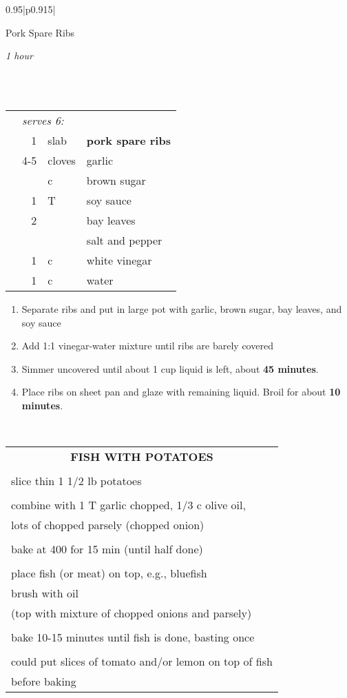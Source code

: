 \documentclass[8pt]{report}
\newcommand{\ingredmargin}{0.25cm}
\newcommand{\fr}[2]{\nicefrac{#1}{#2}}
\newenvironment{recipe}[3]
  {\bigskip \bigskip 
\begin{tabular*}{0.95\textwidth}{|p{0.915\textwidth}|} \hline \vspace{0.25mm}
\begin{minipage}{0.7\textwidth}	\begin{flushleft} {\Large \textsf{#1}} \end{flushleft} \end{minipage}
\begin{minipage}{0.2\textwidth} \begin{flushright} \emph{#2} \end{flushright} \end{minipage} \\ \\ \hline
\begin{ingreds}{#3} \addcontentsline{toc}{section}{#1} \phantomsection \label{rec:#1}} 
  {\\ \hline \end{tabular*} \noindent}
\newenvironment{ingreds}[1]
  {\begin{tabular}{lrlp{0.6\textwidth}} \hspace{\ingredmargin} & \multicolumn{3}{l}{\it #1:} \\}
  {\end{tabular} \medskip}
\newcommand{\ingredsdone}{\end{ingreds}\begin{enumerate}}
\newcommand{\stepsdone}{\end{enumerate} \medskip}
\newcommand{\ingredient}[3]{\hspace{\ingredmargin} & #1 & #2 & #3 \\}
\begin{document}
\begin{recipe}{Pork Spare Ribs}{1 hour}{serves 6}
\index{chinese!pork spare ribs} \index{pork!spare ribs}
\ingredient{1}{slab}{\bf pork spare ribs}
\ingredient{4-5}{cloves}{garlic}
\ingredient{\fr14}{c}{brown sugar}
\ingredient{1}{T}{soy sauce}
\ingredient{2}{}{bay leaves}
\ingredient{}{}{salt and pepper}
\ingredient{1 \fr12}{c}{white vinegar}
\ingredient{1 \fr12}{c}{water}
\ingredsdone
\item Separate ribs and put in large pot with garlic, brown sugar, bay leaves, and soy sauce
\item Add 1:1 vinegar-water mixture until ribs are barely covered
\item Simmer uncovered until about 1 cup liquid is left, about {\bf 45 minutes}.
\item Place ribs on sheet pan and glaze with remaining liquid.  Broil for about {\bf 10 minutes}.
\stepsdone
\end{recipe}

\centering

\begin{tabular}{|l|} \hline	%
 
\multicolumn{1}{|c|}{\textbf{FISH WITH POTATOES}}
\\
\\

\index{fish/meat!fish with potatoes} \index{fish with potatoes}

slice thin 1 1/2 lb potatoes\\
\\
combine with 1 T garlic chopped, 1/3 c olive oil, \\
lots of chopped parsely (chopped onion)\\
\\
bake at 400 for 15 min (until half done)\\
\\
place fish (or meat) on top, e.g., bluefish\\
brush with oil\\
(top with mixture of chopped onions and parsely)\\
\\
bake 10-15 minutes until fish is done, basting once\\
\\
could put slices of tomato and/or lemon on top of fish\\
before baking\\


\hline

\end{tabular}
\end{document}
